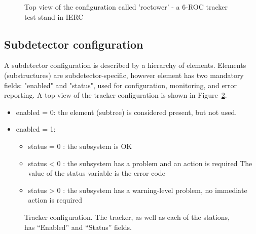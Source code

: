 \begin{figure}[H]
  \caption{
    \label{figure:configuration_top}
    Top view of the configuration called 'roctower' - a 6-ROC tracker test stand in IERC
  }
\end{figure}

\subsection{Subdetector configuration}

A subdetector configuration is described by a hierarchy of elements.
Elements (substructures) are subdetector-specific, however element has
two mandatory fields: "enabled" and "status", used for configuration,
monitoring, and error reporting. A top view of the tracker configuration
is shown in Figure~\ref{figure:tracker_config}.
\begin{itemize}
\item
  enabled = 0: the element (subtree) is considered present, but not used.
\item
  enabled = 1:
  \begin{itemize}
  \item
    status = 0 : the subsystem is OK
  \item
    status < 0 : the subsystem has a problem and an action is required
    The value of the status variable is the error code
  \item
    status > 0 : the subsystem has a warning-level problem, no immediate action
    is required
  \end{itemize}
\end{itemize}

\begin{figure}[H]
  \caption{
    \label{figure:tracker_config}
    Tracker configuration. The tracker, as well as each of the stations, has ``Enabled'' and
    ``Status'' fields.
  }
\end{figure}



